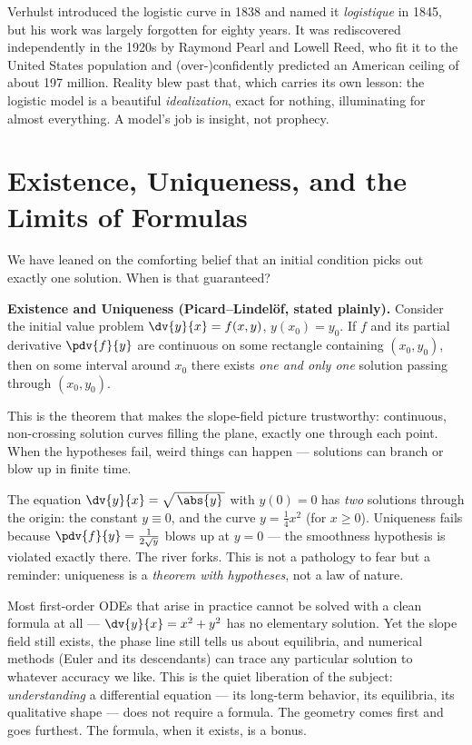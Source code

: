 \begin{historybox}
Verhulst introduced the logistic curve in 1838 and named it \emph{logistique} in
1845, but his work was largely forgotten for eighty years. It was rediscovered
independently in the 1920s by Raymond Pearl and Lowell Reed, who fit it to the
United States population and (over-)confidently predicted an American ceiling of
about 197 million. Reality blew past that, which carries its own lesson: the
logistic model is a beautiful \emph{idealization}, exact for nothing, illuminating
for almost everything. A model's job is insight, not prophecy.
\end{historybox}

\section{Existence, Uniqueness, and the Limits of Formulas}

We have leaned on the comforting belief that an initial condition picks out exactly
one solution. When is that guaranteed?

\begin{formalbox}
\textbf{Existence and Uniqueness (Picard--Lindel\"of, stated plainly).} Consider the
initial value problem $\dv{y}{x}=f(x,y)$, $y(x_0)=y_0$. If $f$ and its partial
derivative $\pdv{f}{y}$ are continuous on some rectangle containing $(x_0,y_0)$, then
on some interval around $x_0$ there exists \emph{one and only one} solution passing
through $(x_0,y_0)$.
\end{formalbox}

This is the theorem that makes the slope-field picture trustworthy: continuous,
non-crossing solution curves filling the plane, exactly one through each point. When
the hypotheses fail, weird things can happen --- solutions can branch or blow up in
finite time.

\begin{trapbox}
The equation $\dv{y}{x}=\sqrt{\,\abs{y}\,}$ with $y(0)=0$ has \emph{two} solutions
through the origin: the constant $y\equiv 0$, and the curve $y=\tfrac14 x^2$ (for
$x\ge 0$). Uniqueness fails because $\pdv{f}{y} = \tfrac{1}{2\sqrt{y}}$ blows up at
$y=0$ --- the smoothness hypothesis is violated exactly there. The river forks. This
is not a pathology to fear but a reminder: uniqueness is a \emph{theorem with
hypotheses}, not a law of nature.
\end{trapbox}

\begin{aestheticbox}
Most first-order ODEs that arise in practice cannot be solved with a clean formula
at all --- $\dv{y}{x}=x^2+y^2$ has no elementary solution. Yet the slope field still
exists, the phase line still tells us about equilibria, and numerical methods (Euler
and its descendants) can trace any particular solution to whatever accuracy we
like. This is the quiet liberation of the subject: \emph{understanding} a
differential equation --- its long-term behavior, its equilibria, its qualitative
shape --- does not require a formula. The geometry comes first and goes furthest.
The formula, when it exists, is a bonus.
\end{aestheticbox}

